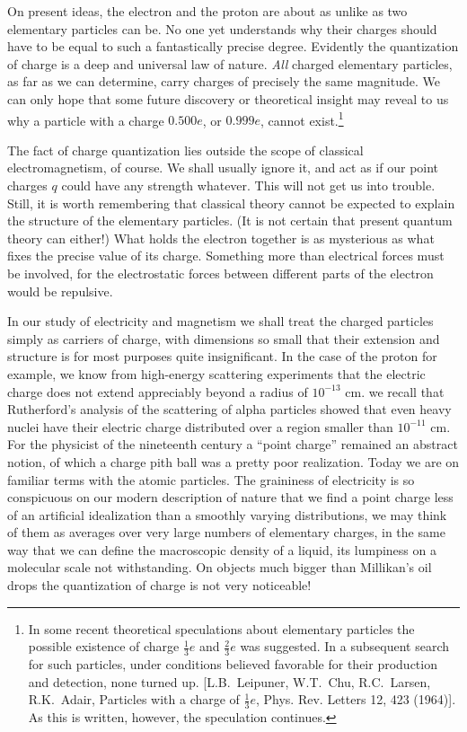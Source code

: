 On present ideas, the electron and the proton are about as
unlike as two elementary particles can be. No one yet understands why their
charges should have to be equal to such a fantastically precise degree.
Evidently the quantization of charge is a deep and universal law of nature.
\emph{All} charged elementary particles, as far as we can determine, carry
charges of precisely the same magnitude. We can only hope that some future
discovery or theoretical insight may reveal to us why a particle with a charge
$0.500e$, or $0.999e$, cannot exist.\footnote{In some recent theoretical speculations
about elementary particles the possible existence of charge $\frac{1}{3}e$ and $\frac{2}{3}e$
was suggested. In a subsequent search for such particles, under conditions believed
favorable for their production and detection, none turned up. [L.B.~Leipuner, W.T.~Chu,
R.C.~Larsen, R.K.~Adair, Particles with a charge of $\frac{1}{3}e$, Phys. Rev. Letters 12, 423 (1964)].
As this is written, however, the speculation continues.}

The fact of charge quantization lies outside the scope of
classical electromagnetism, of course. We shall usually ignore it, and act as
if our point charges $q$ could have any strength whatever. This will not get us
into trouble. Still, it is worth remembering that classical theory cannot be
expected to explain the structure of the elementary particles. (It is not
certain that present quantum theory can either!) What holds the electron
together is as mysterious as what fixes the precise value of its charge.
Something more than electrical forces must be involved, for the electrostatic
forces between different parts of the electron would be repulsive. 

In our study of electricity and magnetism we shall treat the
charged particles simply as carriers of charge, with dimensions so small
that their extension and structure is for most purposes quite
insignificant. In the case of the proton for example, we know from
high-energy scattering experiments that the electric charge does not
extend appreciably beyond a radius of $10^{-13}$ cm. we recall that
Rutherford's analysis of the scattering of alpha particles showed
that even heavy nuclei have their electric charge distributed over a
region smaller than $10^{-11}$ cm. For the physicist of the
nineteenth century a ``point charge'' remained an abstract notion, of
which a charge pith ball was a pretty poor realization. Today we are
on familiar terms with the atomic particles. The graininess of
electricity is so conspicuous on our modern description of nature
that we find a point charge less of an artificial idealization than a
smoothly varying distributions, we may think of them as averages over
very large numbers of elementary charges, in the same way that we can
define the macroscopic density of a liquid, its lumpiness on a
molecular scale not withstanding. On objects much bigger than
Millikan's oil drops the quantization of charge is not very
noticeable!

